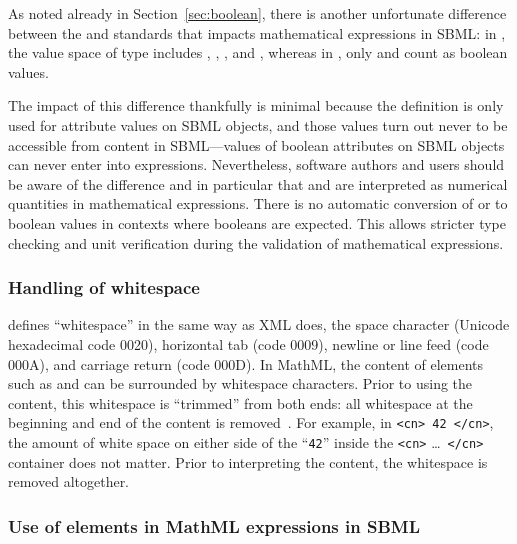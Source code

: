 As noted already in Section~\ref{sec:boolean}, there is another
unfortunate difference between the \xmlschemaone and \mathmltwo
standards that impacts mathematical expressions in SBML: in
\xmlschema, the value space of type  includes
, , , and , whereas in
\mathml, only  and  count as boolean
values.

The impact of this difference thankfully is minimal because the
\xmlschema definition is only used for attribute values on SBML
objects, and those values turn out never to be accessible from
\mathml content in SBML---values of boolean attributes on SBML objects
can never enter into \mathml expressions.  Nevertheless, software
authors and users should be aware of the difference and in
particular that  and  are interpreted as numerical
quantities in mathematical expressions.  There is no automatic
conversion of  or  to boolean values in contexts
where booleans are expected.  This allows stricter type checking
and unit verification during the validation of mathematical
expressions.


\subsubsection{Handling of whitespace}
\label{sec:mathml-whitespace}

\mathmltwo defines ``whitespace'' in the same way as XML does, \ie
the space character (Unicode hexadecimal code 0020), horizontal
tab (code 0009), newline or line feed (code 000A), and carriage
return (code 000D).  In MathML, the content of elements such as
 and  can be surrounded by whitespace
characters.  Prior to using the content, this whitespace is
``trimmed'' from both ends: all whitespace at the beginning and
end of the content is removed~\citep{ausbrooks:2003}.  For
example, in \texttt{<cn> 42 </cn>}, the amount of white space on
either side of the ``\texttt{42}'' inside the \texttt{<cn>}
\ldots\ \texttt{</cn>} container does not matter.  Prior to
interpreting the content, the whitespace is removed altogether.


\subsubsection{Use of  elements in MathML expressions in SBML}
\label{sec:csymbol-token}
\label{sec:csymbol}

